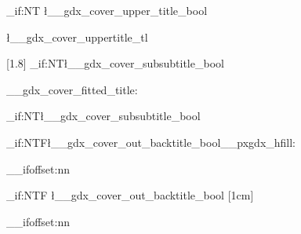 {\begin{center}
{\begin{minipage}[b][\l__gdx_cover_header_height][t]{.9\textwidth}
				\begin{minipage}[b][\l__gdx_cover_header_height][b]{.3\textwidth}
					\centering	%
					\bool_if:NT \l__gdx_cover_upper_title_bool
					{	\par\vspace*{\fill}\hspace*{\baselineskip}
						\parbox[b][\height][t]{.85\textwidth}{\raggedright\large\l__gdx_cover_uppertitle_tl}
						\hspace*{\baselineskip}\par
					}
					\vspace*{\fill}\scalebox{1.3}[1.8]{}
					\vspace{\baselineskip}\bool_if:NT\l__gdx_cover_subsubtitle_bool {\vspace*{1cm}}
				\end{minipage}
				\begin{minipage}[b][\l__gdx_cover_subheader_height][b]{.7\textwidth}
					\parbox[b][\l__gdx_cover_subheader_height][t]{\linewidth}
						{\centering\__gdx_cover_fitted_title:}
				\end{minipage}
				\par\bool_if:NT\l__gdx_cover_subsubtitle_bool{
					\vspace{-1cm}\bool_if:NTF\l__gdx_cover_out_backtitle_bool{\__pxgdx_hfill:}{
						\__ifoffset:nn{\par\vspace*{-.4\l__gdx_cover_fontmax}}{\par\vspace*{-.4\l__gdx_cover_fontmax}}
					}
					\begin{minipage}[t][1cm][b]{.85\textwidth}
						\bool_if:NTF \l__gdx_cover_out_backtitle_bool {\raggedleft}{}
						\pxGrow*{\bfseries\textcolor{\l__gdx_cover_text_aux_color_tl}{\l__gdx_cover_subsubtitle_tl}}[1cm]
						\vspace*{-.2cm}\par\noindent
					\end{minipage}
				}
			\end{minipage}
		}
		\__ifoffset:nn{\vspace*{1.2\l__gdx_em}\par}{\vspace*{0.8\l__gdx_em}\par	}

\end{center}}
